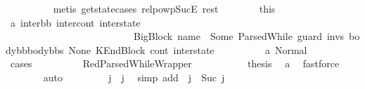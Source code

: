 \begin{isabellebody}
\ \ \ \ \ \ \ \ \isamarkupfalse%
\ {\isacharparenleft}{\kern0pt}metis\ get{\isacharunderscore}{\kern0pt}state{\isachardot}{\kern0pt}cases\ relpowp{\isacharunderscore}{\kern0pt}Suc{\isacharunderscore}{\kern0pt}E{}\ rest{\isacharparenright}{\kern0pt}\isanewline
\ \ \ \ \ \ \isamarkupfalse%
\ this\ \isamarkupfalse%
\ a{}{\isacharcolon}{\kern0pt}\ {\isachardoublequoteopen}{\isacharparenleft}{\kern0pt}inter{\isacharunderscore}{\kern0pt}bb{}{\isacharcomma}{\kern0pt}\ inter{\isacharunderscore}{\kern0pt}cont{}{\isacharcomma}{\kern0pt}\ inter{\isacharunderscore}{\kern0pt}state{}{\isacharparenright}{\kern0pt}\ {\isacharequal}{\kern0pt}\ \isanewline
\ \ \ \ \ \ \ \ \ \ \ \ \ \ \ \ \ \ \ \ \ \ \ \ \ \ {\isacharparenleft}{\kern0pt}{\isacharparenleft}{\kern0pt}BigBlock\ name\ {\isacharbrackleft}{\kern0pt}{\isacharbrackright}{\kern0pt}\ {\isacharparenleft}{\kern0pt}Some\ {\isacharparenleft}{\kern0pt}ParsedWhile\ guard\ invs\ {\isacharparenleft}{\kern0pt}body{\isacharunderscore}{\kern0pt}bb{}{\isacharhash}{\kern0pt}body{\isacharunderscore}{\kern0pt}bbs{\isacharparenright}{\kern0pt}{\isacharparenright}{\kern0pt}{\isacharparenright}{\kern0pt}\ None{\isacharparenright}{\kern0pt}{\isacharcomma}{\kern0pt}\ KEndBlock\ cont{}{\isacharcomma}{\kern0pt}\ inter{\isacharunderscore}{\kern0pt}state{\isacharparenright}{\kern0pt}{\isachardoublequoteclose}\isanewline
\ \ \ \ \ \ \ \ \isamarkupfalse%
\ a{}\ Normal\isanewline
\ \ \ \ \ \ \isamarkupfalse%
\ cases\isanewline
\ \ \ \ \ \ \ \ \isamarkupfalse%
\ RedParsedWhileWrapper\ \isanewline
\ \ \ \ \ \ \ \ \isamarkupfalse%
\ {\isacharquery}{\kern0pt}thesis\ \isamarkupfalse%
\ a{}\ \isamarkupfalse%
\ fastforce\isanewline
\ \ \ \ \ \ \isamarkupfalse%
\ auto\ \isanewline
\isanewline
\ \ \ \ \ \ \isamarkupfalse%
\ {\isachardoublequoteopen}j{\isacharprime}{\kern0pt}{\isacharprime}{\kern0pt}\ {\isacharless}{\kern0pt}\ j{\isachardoublequoteclose}\ \isamarkupfalse%
\ {\isacharparenleft}{\kern0pt}simp\ add{\isacharcolon}{\kern0pt}\ {\isachardoublequoteopen}{}{\isachardoublequoteclose}\ {\isacartoucheopen}j\ {\isacharequal}{\kern0pt}\ Suc\ j{\isacharprime}{\kern0pt}{\isacartoucheclose}{\isacharparenright}{\kern0pt}\isanewline
\ \ \ \ \ \ \isamarkupfalse%
\ \isamarkupfalse%

\end{isabellebody}
